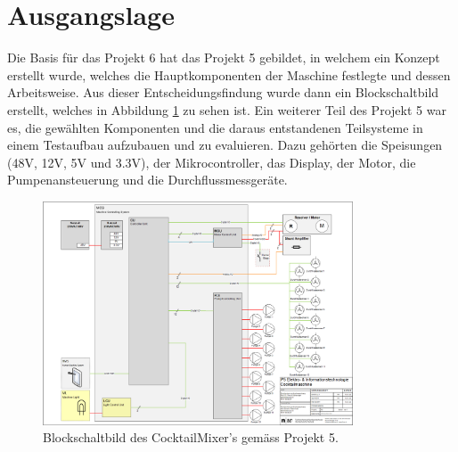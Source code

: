 \section{Ausgangslage}
\label{sec:Ausgangslage}

Die Basis für das Projekt 6 hat das Projekt 5 gebildet, in welchem ein Konzept erstellt wurde, welches die Hauptkomponenten der Maschine festlegte und dessen Arbeitsweise. Aus dieser Entscheidungsfindung wurde dann ein Blockschaltbild erstellt, welches in Abbildung \ref{fig:P5_Blockschaltbild_Cocktailmixer} zu sehen ist. Ein weiterer Teil des Projekt 5 war es, die gewählten Komponenten und die daraus entstandenen Teilsysteme in einem Testaufbau aufzubauen und zu evaluieren. Dazu gehörten die Speisungen (48V, 12V, 5V und 3.3V), der Mikrocontroller, das Display, der Motor, die Pumpenansteuerung und die Durchflussmessgeräte.

\begin{figure}[h!]
\center
\includegraphics[angle=90, width = 0.82\textwidth]{graphics/P5-Blockschema}
\caption{Blockschaltbild des CocktailMixer's gemäss Projekt 5.}
\label{fig:P5_Blockschaltbild_Cocktailmixer}
\end{figure}

\newpage

